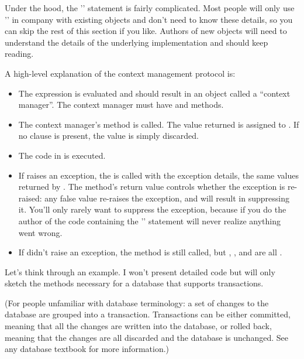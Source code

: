 \documentclass{howto}
\begin{document}
Under the hood, the '' statement is fairly complicated.
Most people will only use '' in company with existing
objects and don't need to know these details, so you can skip the rest
of this section if you like.  Authors of new objects will need to
understand the details of the underlying implementation and should
keep reading.

A high-level explanation of the context management protocol is:

\begin{itemize}

\item The expression is evaluated and should result in an object
called a ``context manager''.  The context manager must have
 and  methods.

\item The context manager's  method is called.  The value
returned is assigned to .  If no  clause
is present, the value is simply discarded.

\item The code in  is executed.

\item If  raises an exception, the
 is called
with the exception details, the same values returned by
.  The method's return value controls whether
the exception is re-raised: any false value re-raises the exception,
and  will result in suppressing it.  You'll only rarely
want to suppress the exception, because if you do
the author of the code containing the
'' statement will never realize anything went wrong.

\item If  didn't raise an exception, 
the  method is still called,
but , , and  are all .

\end{itemize}

Let's think through an example.  I won't present detailed code but
will only sketch the methods necessary for a database that supports
transactions.

(For people unfamiliar with database terminology: a set of changes to
the database are grouped into a transaction.  Transactions can be
either committed, meaning that all the changes are written into the
database, or rolled back, meaning that the changes are all discarded
and the database is unchanged.  See any database textbook for more
information.)
\end{document}
